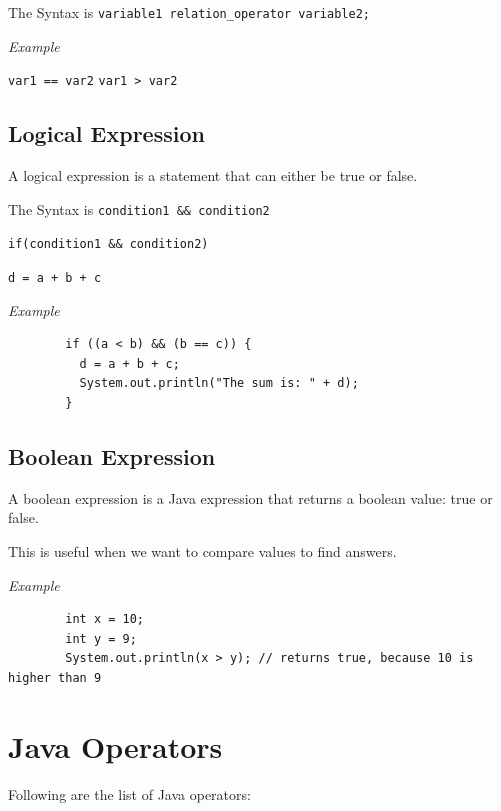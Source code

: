 \documentclass[11pt, a4paper]{book}
\begin{document}
        The Syntax is \texttt{variable1 relation\_operator variable2;}
        
        \textit{Example}
        
        \texttt{var1 == var2}
        \texttt{var1 > var2}
      
      \subsection{Logical Expression}
        A logical expression is a statement that can either be true or false.
        
        The Syntax is \texttt{condition1 \&\& condition2}
        
        \texttt{if(condition1 \&\& condition2)}
        
        \texttt{d = a + b + c}
        
        \textit{Example}
        \begin{lstlisting}
        if ((a < b) && (b == c)) {
          d = a + b + c;
          System.out.println("The sum is: " + d);
        }
        \end{lstlisting}
      
      \subsection{Boolean Expression}
        A boolean expression is a Java expression that returns a boolean value: true or false.
        
        This is useful when we want to compare values to find answers.
        
        \textit{Example}
        \begin{lstlisting}
        int x = 10;
        int y = 9;
        System.out.println(x > y); // returns true, because 10 is higher than 9
        \end{lstlisting}
    
    \section{Java Operators}
      Following are the list of Java operators:
      
\end{document}

